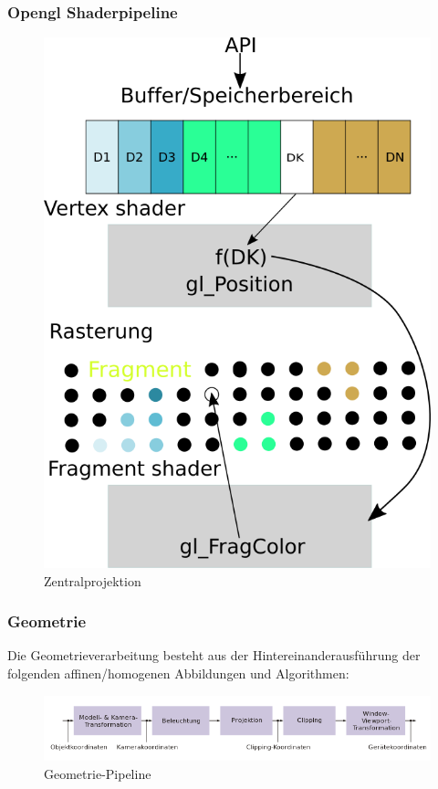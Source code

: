\subsubsection{Opengl Shaderpipeline}
\begin{figure}[H]
	\centering
	\includegraphics[width=1.0\textwidth]{images/Zeichnung_Shaderpipeline.png}
	\caption{Zentralprojektion}
	\label{fig:projection-sight-vol}
\end{figure}


\subsubsection{Geometrie}
Die Geometrieverarbeitung   besteht aus der Hintereinanderausführung der folgenden affinen/homogenen Abbildungen und Algorithmen:
\begin{figure}[H]
    \centering
    \includegraphics[width=1.0\textwidth]{images/cgpipeline.png}
    \caption{Geometrie-Pipeline}
    \label{fig:cgpipeline-geometry}
\end{figure}

